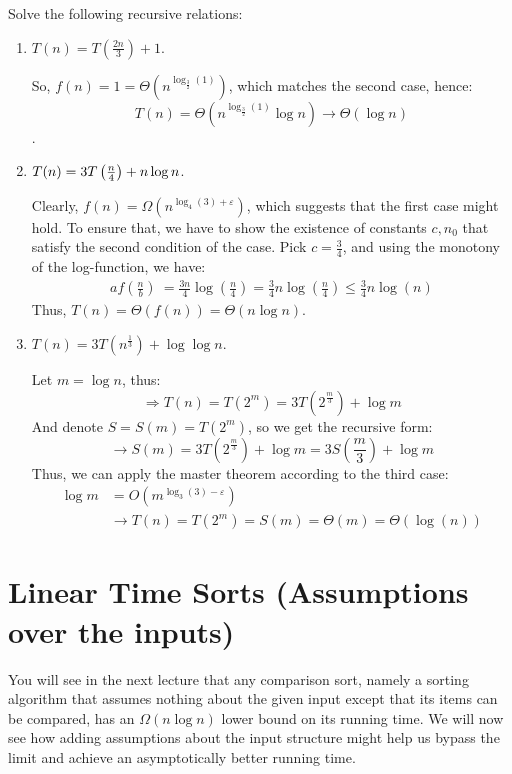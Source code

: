 \begin{example} Solve the following recursive relations: 
\begin{enumerate}
  \item $ T(n) = T(\frac{2n}{3}) + 1 $. 

    \noindent So, $f(n) = 1 = \Theta ( n^{\log_{\frac{3}{2}} (1)}) $, which matches the second case, hence: $$T(n) = \Theta ( n^{\log_{\frac{3}{2}} (1)}\log n ) \rightarrow \Theta( \log n ) $$.
    
  \item $T(n) = 3 T\left(\frac{n}{4}\right) + n\log n $.
    
    \noindent Clearly, $f(n) = \Omega( n^{\log_{4}(3) + \varepsilon}  ) $, which suggests that the first case might hold. To ensure that, we have to show the existence of constants $c, n_{0}$ that satisfy the second condition of the case. Pick $c = \frac{3}{4}$, and using the monotony of the log-function, we have:
    \begin{equation*}
      \begin{split}
        af( \frac{n}{b})~=\frac{3n}{4}\log(\frac{n}{4}) = \frac{3}{4}n\log(\frac{n}{4}) \le \frac{3}{4} n \log ( n ) 
      \end{split}
    \end{equation*}
    Thus, $T(n) =  \Theta(f(n))  = \Theta(n\log n)$.
    
    \item $T(n) = 3T( n^{\frac{1}{3}}) + \log\log n$. 
   
      \noindent Let $ m = \log n $, thus: $$\Rightarrow T( n) = T (2^m ) = 3T(2^{\frac{m}{3}} ) + \log m $$ And denote $ S = S(m) = T(2^m) $, so we get the recursive form: $$\rightarrow S(m) = 3T(2^{\frac{m}{3}} ) + \log m = 3S(\frac{m}{3} ) + \log m $$ Thus, we can apply the master theorem according to the third case:
      \begin{equation*}
        \begin{split}
      \log m &= O(m^{\log_{3}(3)-\varepsilon} ) \\ 
      & \rightarrow T(n) = T(2^m) = S(m) = \Theta(m) = \Theta( \log(n)) 
        \end{split}
      \end{equation*}
\end{enumerate}
\end{example}


\newpage

\section{Linear Time Sorts (Assumptions over the inputs)}
You will see in the next lecture that any comparison sort, namely a sorting algorithm that assumes nothing about the given input except that its items can be compared, has an $\Omega(n\log n)$ lower bound on its running time. We will now see how adding assumptions about the input structure might help us bypass the limit and achieve an asymptotically better running time.

